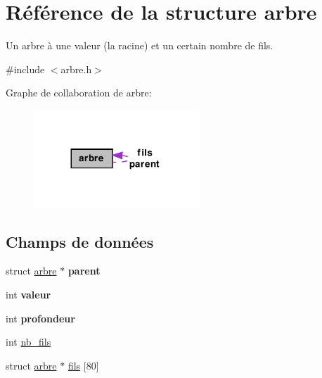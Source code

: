 \hypertarget{structarbre}{
\section{Référence de la structure arbre}
\label{structarbre}
}


Un arbre à une valeur (la racine) et un certain nombre de fils.  




{\ttfamily \#include $<$arbre.h$>$}



Graphe de collaboration de arbre:\nopagebreak
\begin{figure}[H]
\begin{center}
\leavevmode
\includegraphics[width=176pt]{structarbre__coll__graph}
\end{center}
\end{figure}
\subsection*{Champs de données}
\begin{DoxyCompactItemize}
\item 
\hypertarget{structarbre_a4a8f7bc357d6e8bff6aa5eee7a166f81}{
struct \hyperlink{structarbre}{arbre} $\ast$ {\bfseries parent}}
\label{structarbre_a4a8f7bc357d6e8bff6aa5eee7a166f81}

\item 
\hypertarget{structarbre_a8e030c012e3b74a6d076739c4c7ecb69}{
int {\bfseries valeur}}
\label{structarbre_a8e030c012e3b74a6d076739c4c7ecb69}

\item 
\hypertarget{structarbre_aa9b3fa948258da2518cebbe8cb191431}{
int {\bfseries profondeur}}
\label{structarbre_aa9b3fa948258da2518cebbe8cb191431}

\item 
int \hyperlink{structarbre_a67c44f020d501282adc38e3301a5f245}{nb\_\-fils}
\item 
struct \hyperlink{structarbre}{arbre} $\ast$ \hyperlink{structarbre_a7bac08e3c2aedbde0dddf80b94eadf76}{fils} \mbox{[}80\mbox{]}
\end{DoxyCompactItemize}


